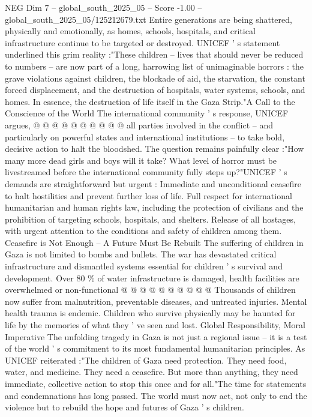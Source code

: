 \begin{textsample}{NEG Dim 7 – global\_south\_2025\_05 – Score -1.00 – global\_south\_2025\_05/125212679.txt}
Entire generations are being shattered, physically and emotionally, as homes, schools, hospitals, and critical infrastructure continue to be targeted or destroyed.
UNICEF ' s statement underlined this grim reality :"These children -- lives that should never be reduced to numbers -- are now part of a long, harrowing list of unimaginable horrors : the grave violations against children, the blockade of aid, the starvation, the constant forced displacement, and the destruction of hospitals, water systems, schools, and homes.
In essence, the destruction of life itself in the Gaza Strip."A Call to the Conscience of the World The international community ' s response, UNICEF argues, @ @ @ @ @ @ @ @ @ @ all parties involved in the conflict -- and particularly on powerful states and international institutions -- to take bold, decisive action to halt the bloodshed.
The question remains painfully clear :"How many more dead girls and boys will it take?
What level of horror must be livestreamed before the international community fully steps up?"UNICEF ' s demands are straightforward but urgent : Immediate and unconditional ceasefire to halt hostilities and prevent further loss of life.
Full respect for international humanitarian and human rights law, including the protection of civilians and the prohibition of targeting schools, hospitals, and shelters.
Release of all hostages, with urgent attention to the conditions and safety of children among them.
Ceasefire is Not Enough -- A Future Must Be Rebuilt The suffering of children in Gaza is not limited to bombs and bullets.
The war has devastated critical infrastructure and dismantled systems essential for children ' s survival and development.
Over 80 \% of water infrastructure is damaged, health facilities are overwhelmed or non-functional @ @ @ @ @ @ @ @ @ @ Thousands of children now suffer from malnutrition, preventable diseases, and untreated injuries.
Mental health trauma is endemic.
Children who survive physically may be haunted for life by the memories of what they ' ve seen and lost.
Global Responsibility, Moral Imperative The unfolding tragedy in Gaza is not just a regional issue -- it is a test of the world ' s commitment to its most fundamental humanitarian principles.
As UNICEF reiterated :"The children of Gaza need protection.
They need food, water, and medicine.
They need a ceasefire.
But more than anything, they need immediate, collective action to stop this once and for all."The time for statements and condemnations has long passed.
The world must now act, not only to end the violence but to rebuild the hope and futures of Gaza ' s children.

\end{textsample}
